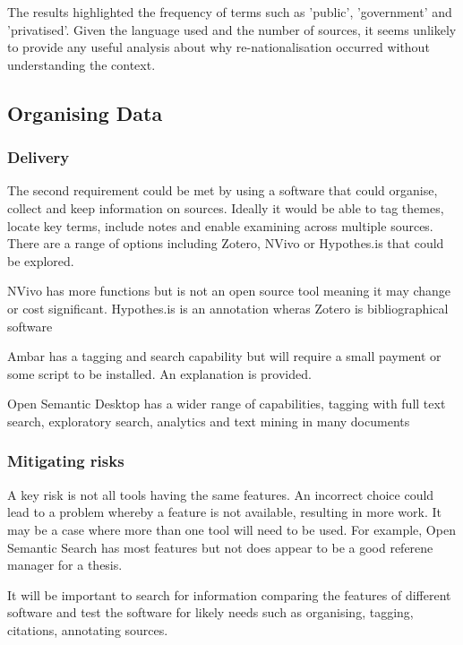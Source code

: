 \documentclass{article}
\begin{document}
The results highlighted the frequency of terms such as 'public', 'government' and 'privatised'. Given the language used and the number of sources, it seems unlikely to provide any useful analysis about why re-nationalisation occurred without understanding the context.

\subsection*{Organising Data}
\subsubsection*{Delivery}

The second requirement could be met by using a software that could organise, collect and keep information on sources. Ideally it would be able to tag themes, locate key terms, include notes and enable examining across multiple sources. There are a range of options including Zotero, NVivo or Hypothes.is that could be explored.

NVivo has more functions but is not an open source tool meaning it may change or cost significant. Hypothes.is is an annotation wheras Zotero is bibliographical software

Ambar has a tagging and search capability but will require a small payment or some script to be installed. An explanation is provided.

Open Semantic Desktop has a wider range of capabilities, tagging with full text search, exploratory search, analytics and text mining in many documents

\subsubsection*{Mitigating risks}

A key risk is not all tools having the same features. An incorrect choice could lead to a problem whereby a feature is not available, resulting in more work. It may be a case where more than one tool will need to be used. For example, Open Semantic Search has most features but not does appear to be a good referene manager for a thesis.\par 

It will be important to search for information comparing the features of different software and test the software for likely needs such as organising, tagging, citations, annotating sources.\par
\end{document}
